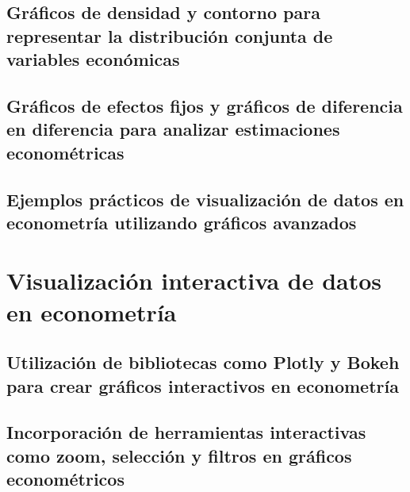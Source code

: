 \documentclass[
  a4paper,
]{article}
\begin{document}
\hypertarget{gruxe1ficos-de-densidad-y-contorno-para-representar-la-distribuciuxf3n-conjunta-de-variables-econuxf3micas}{%
\subsection{Gráficos de densidad y contorno para representar la
distribución conjunta de variables
económicas}\label{gruxe1ficos-de-densidad-y-contorno-para-representar-la-distribuciuxf3n-conjunta-de-variables-econuxf3micas}}

\hypertarget{gruxe1ficos-de-efectos-fijos-y-gruxe1ficos-de-diferencia-en-diferencia-para-analizar-estimaciones-economuxe9tricas}{%
\subsection{Gráficos de efectos fijos y gráficos de diferencia en
diferencia para analizar estimaciones
econométricas}\label{gruxe1ficos-de-efectos-fijos-y-gruxe1ficos-de-diferencia-en-diferencia-para-analizar-estimaciones-economuxe9tricas}}

\hypertarget{ejemplos-pruxe1cticos-de-visualizaciuxf3n-de-datos-en-econometruxeda-utilizando-gruxe1ficos-avanzados}{%
\subsection{Ejemplos prácticos de visualización de datos en econometría
utilizando gráficos
avanzados}\label{ejemplos-pruxe1cticos-de-visualizaciuxf3n-de-datos-en-econometruxeda-utilizando-gruxe1ficos-avanzados}}

\hypertarget{visualizaciuxf3n-interactiva-de-datos-en-econometruxeda}{%
\section{Visualización interactiva de datos en
econometría}\label{visualizaciuxf3n-interactiva-de-datos-en-econometruxeda}}

\hypertarget{utilizaciuxf3n-de-bibliotecas-como-plotly-y-bokeh-para-crear-gruxe1ficos-interactivos-en-econometruxeda}{%
\subsection{Utilización de bibliotecas como Plotly y Bokeh para crear
gráficos interactivos en
econometría}\label{utilizaciuxf3n-de-bibliotecas-como-plotly-y-bokeh-para-crear-gruxe1ficos-interactivos-en-econometruxeda}}

\hypertarget{incorporaciuxf3n-de-herramientas-interactivas-como-zoom-selecciuxf3n-y-filtros-en-gruxe1ficos-economuxe9tricos}{%
\subsection{Incorporación de herramientas interactivas como zoom,
selección y filtros en gráficos
econométricos}\label{incorporaciuxf3n-de-herramientas-interactivas-como-zoom-selecciuxf3n-y-filtros-en-gruxe1ficos-economuxe9tricos}}
\end{document}
